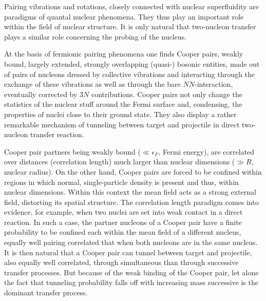 Pairing vibrations and rotations, closely connected with nuclear superfluidity are  paradigms of quantal nuclear phenomena. They thus play an important  role within the field of nuclear structure. It is only natural that two-nucleon transfer plays a similar role concerning the probing of the nucleus.

 
At the basis of fermionic pairing phenomena one finds Cooper pairs, weakly bound, largely extended, strongly overlapping (quasi-) bosonic entities, made out of pairs of nucleons dressed by collective vibrations and interacting through the exchange of these vibrations as well as through the bare $NN$-interaction, eventually corrected by $3N$ contributions.
Cooper pairs not only change the statistics of the nuclear stuff around the Fermi surface and, condensing, the properties of nuclei close to their ground state. They also display a rather remarkable mechanism of tunneling between  target and projectile in  direct two-nucleon transfer reaction.


Cooper pair partners being weakly bound ($\ll \epsilon_F$, Fermi energy), are correlated over distances (correlation length) much larger than nuclear dimensions ($\gg R$, nuclear radius). On the other hand, Cooper pairs are forced to be confined within regions in which normal, single-particle density is present and thus, within nuclear dimensions. Within this context the mean field acts as a strong external field,  distorting its spatial structure.
 The correlation length paradigm comes into evidence, for example, when two nuclei are set into weak contact in a direct reaction. In such a  case,  the partner nucleons of a Cooper pair have a finite probability to be confined each within the mean field of a different nucleus, equally well pairing correlated that when both nucleons are in the same nucleus. It is then natural that a Cooper pair can tunnel between target and projectile, also equally well correlated, through simultaneous than through successive transfer processes. But because of the weak binding of the Cooper pair, let alone the fact that tunneling probability falls off with increasing mass successive is the dominant transfer process.
 
